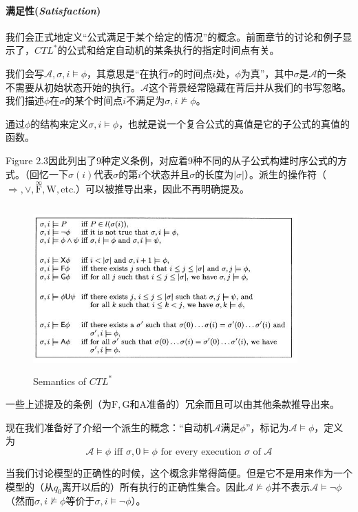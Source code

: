 \documentclass{book}
\begin{document}
    \paragraph{满足性({\itshape Satisfaction})}我们会正式地定义“公式满足于某个给定的情况”的概念。前面章节的讨论和例子显示了，$CTL^*$的公式和给定自动机的某条执行的指定时间点有关。

    我们会写$\mathcal{A}, \sigma, i \models \phi $，其意思是“在执行$\sigma$的时间点$i$处，$\phi$为真”，其中$\sigma$是$\mathcal{A}$的一条不需要从初始状态开始的执行。$\mathcal{A}$这个背景经常隐藏在背后并从我们的书写忽略。我们描述$\phi$在$\sigma$的某个时间点$i$不满足为$\sigma, i\nvDash \phi$。

    通过$\phi$的结构来定义$\sigma, i \models \phi$，也就是说一个复合公式的真值是它的子公式的真值的函数。

    Figure 2.3因此列出了9种定义条例，对应着9种不同的从子公式构建时序公式的方式。（回忆一下$\sigma(i)$代表$\sigma$的第$i$个状态并且$\sigma$的长度为$|\sigma|$）。派生的操作符（$\Rightarrow, \vee, \overset{\infty}{\mathrm{F}}, \mathrm{W},$etc.）可以被推导出来，因此不再明确提及。
    \begin{figure}
        \centering
        \includegraphics[width=4.0in,height=2.5in]{2_3.jpg}
    \caption{Semantics of $CTL^*$}
    \end{figure}

    一些上述提及的条例（为$\mathrm{F},\mathrm{G}$和$\mathrm{A}$准备的）冗余而且可以由其他条款推导出来。

    现在我们准备好了介绍一个派生的概念：“自动机$\mathcal{A}满足\phi$”，标记为$\mathcal{A}\models\phi$，定义为
    \begin{equation}\label{D1}
      \mathcal{A}\models \phi \text{ iff } \sigma,0\models\phi \text{ for every execution } \sigma \text{ of } \mathcal{A}
    \end{equation}

    当我们讨论模型的正确性的时候，这个概念非常得简便。但是它不是用来作为一个模型的（从$q_0$离开以后的）所有执行的正确性集合。因此$\mathcal{A}\nvDash\phi$并不表示$\mathcal{A} \models \neg\phi$（然而$\sigma,i \nvDash \phi$等价于$\sigma,i \models \neg \phi$）。
\end{document}

